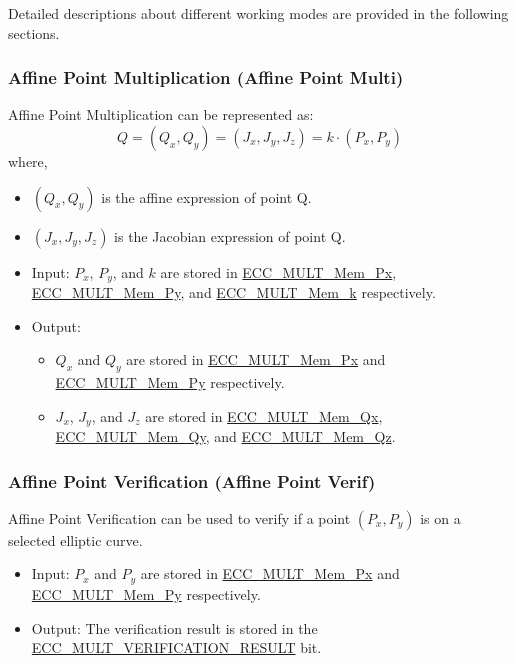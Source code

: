 \documentclass[main\_\_EN.tex]{subfiles}
\begin{document}
Detailed descriptions about different working modes are provided in the following sections.

\subsubsection{Affine Point Multiplication (Affine Point Multi)}

Affine Point Multiplication can be represented as:
\[
Q = (Q_x,Q_y) = (J_x,J_y,J_z) = k \cdot (P_x,P_y)
\]
where,
\begin{itemize}
    \item $(Q_x,Q_y)$ is the affine expression of point Q.
    \item $(J_x,J_y,J_z)$ is the Jacobian expression of point Q.
    \item Input: $P_x$, $P_y$, and $k$  are stored in \hyperref[tab:ecc-memory]{ECC\_MULT\_Mem\_Px}, \hyperref[tab:ecc-memory]{ECC\_MULT\_Mem\_Py}, and \hyperref[tab:ecc-memory]{ECC\_MULT\_Mem\_k} respectively.
    \item Output:
    \begin{itemize}
        \item $Q_x$ and $Q_y$ are stored in \hyperref[tab:ecc-memory]{ECC\_MULT\_Mem\_Px} and \hyperref[tab:ecc-memory]{ECC\_MULT\_Mem\_Py} respectively.
        \item $J_x$, $J_y$, and $J_z$ are stored in \hyperref[tab:ecc-memory]{ECC\_MULT\_Mem\_Qx}, \hyperref[tab:ecc-memory]{ECC\_MULT\_Mem\_Qy}, and \hyperref[tab:ecc-memory]{ECC\_MULT\_Mem\_Qz}.
    \end{itemize}
\end{itemize}

\subsubsection{Affine Point Verification (Affine Point Verif)}

Affine Point Verification can be used to verify if a point  $(P_x,P_y)$ is on a selected elliptic curve.

\begin{itemize}
    \item Input: $P_x$ and $P_y$ are stored in \hyperref[tab:ecc-memory]{ECC\_MULT\_Mem\_Px} and \hyperref[tab:ecc-memory]{ECC\_MULT\_Mem\_Py} respectively.
    \item Output: The verification result is stored in the \hyperref[fielddesc:ECCMULTVERIFICATIONRESULT]{ECC\_MULT\_VERIFICATION\_RESULT} bit.
\end{itemize}
\end{document}

